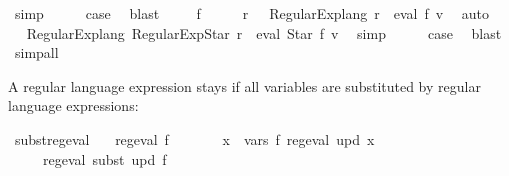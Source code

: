 \begin{isabellebody}
\ simp\isanewline
\ \ \isamarkupfalse%
\ \isamarkupfalse%
\ {\isacharquery}{\kern0pt}case\ \isamarkupfalse%
\ blast\isanewline
{}\isamarkupfalse%
\isanewline
\ \ \isamarkupfalse%
\ {\isacharparenleft}{\kern0pt}{}\ f{\isacharparenright}{\kern0pt}\isanewline
\ \ \isamarkupfalse%
\ \isamarkupfalse%
\ r\ \ \ {\isachardoublequoteopen}Regular{\isacharunderscore}{\kern0pt}Exp{\isachardot}{\kern0pt}lang\ r\ {\isacharequal}{\kern0pt}\ eval\ f\ v{\isachardoublequoteclose}\ \isamarkupfalse%
\ auto\isanewline
\ \ \isamarkupfalse%
\ \isamarkupfalse%
\ {\isachardoublequoteopen}Regular{\isacharunderscore}{\kern0pt}Exp{\isachardot}{\kern0pt}lang\ {\isacharparenleft}{\kern0pt}Regular{\isacharunderscore}{\kern0pt}Exp{\isachardot}{\kern0pt}Star\ r{\isacharparenright}{\kern0pt}\ {\isacharequal}{\kern0pt}\ eval\ {\isacharparenleft}{\kern0pt}Star\ f{\isacharparenright}{\kern0pt}\ v{\isachardoublequoteclose}\ \isamarkupfalse%
\ simp\isanewline
\ \ \isamarkupfalse%
\ \isamarkupfalse%
\ {\isacharquery}{\kern0pt}case\ \isamarkupfalse%
\ blast\isanewline
{}\isamarkupfalse%
\ simp{\isacharunderscore}{\kern0pt}all%
\endisatagproof
{\isafoldproof}%
%
\isadelimproof
%
\endisadelimproof
%
\begin{isamarkuptext}%
A  regular language expression stays  if all variables are substituted
by  regular language expressions:%
\end{isamarkuptext}\isamarkuptrue%
\isamarkupfalse%
\ subst{\isacharunderscore}{\kern0pt}reg{\isacharunderscore}{\kern0pt}eval{\isacharcolon}{\kern0pt}\isanewline
\ \ \ {\isachardoublequoteopen}reg{\isacharunderscore}{\kern0pt}eval\ f{\isachardoublequoteclose}\isanewline
\ \ \ \ \ \ \ {\isachardoublequoteopen}{\isasymforall}x\ {\isasymin}\ vars\ f{\isachardot}{\kern0pt}\ reg{\isacharunderscore}{\kern0pt}eval\ {\isacharparenleft}{\kern0pt}upd\ x{\isacharparenright}{\kern0pt}{\isachardoublequoteclose}\isanewline
\ \ \ \ \ {\isachardoublequoteopen}reg{\isacharunderscore}{\kern0pt}eval\ {\isacharparenleft}{\kern0pt}subst\ upd\ f{\isacharparenright}{\kern0pt}{\isachardoublequoteclose}\isanewline

\end{isabellebody}
